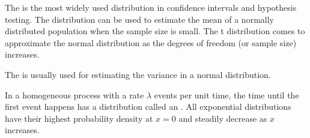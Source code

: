 The  is the most widely used distribution in confidence intervals and hypothesis testing. The distribution can be used to estimate the mean of a normally distributed population when the sample size is small. The t distribution comes to approximate the normal distribution as the degrees of freedom (or sample size) increases.
\begin{center}
\end{center}

The  is usually used for estimating the variance in a normal distribution.

In a homogeneous  process with a rate $\lambda$ events per unit time, the time until the first event happens has a distribution called an . All exponential distributions have their highest probability density at $x=0$ and steadily decrease as $x$ increases.
\begin{center}
\end{center}

